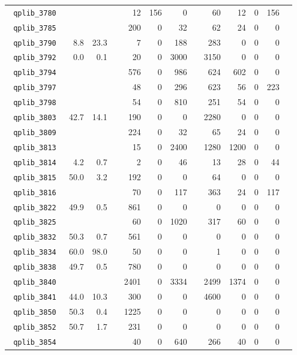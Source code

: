 {\begin{longtable}{lrrrrrrrrrrrr}
\texttt{ 	qplib\_3780	}	&		&		&	&	12	&	156	&	0	&	&	60	&	12	&	0	&	156	\\
\texttt{ 	qplib\_3785	}	&		&		&	&	200	&	0	&	32	&	&	62	&	24	&	0	&	0	\\
\texttt{ 	qplib\_3790	}	&	8.8	&	23.3	&	&	7	&	0	&	188	&	&	283	&	0	&	0	&	0	\\
\texttt{ 	qplib\_3792	}	&	0.0	&	0.1	&	&	20	&	0	&	3000	&	&	3150	&	0	&	0	&	0	\\
\texttt{ 	qplib\_3794	}	&		&		&	&	576	&	0	&	986	&	&	624	&	602	&	0	&	0	\\
\texttt{ 	qplib\_3797	}	&		&		&	&	48	&	0	&	296	&	&	623	&	56	&	0	&	223	\\
\texttt{ 	qplib\_3798	}	&		&		&	&	54	&	0	&	810	&	&	251	&	54	&	0	&	0	\\
\texttt{ 	qplib\_3803	}	&	42.7	&	14.1	&	&	190	&	0	&	0	&	&	2280	&	0	&	0	&	0	\\
\texttt{ 	qplib\_3809	}	&		&		&	&	224	&	0	&	32	&	&	65	&	24	&	0	&	0	\\
\texttt{ 	qplib\_3813	}	&		&		&	&	15	&	0	&	2400	&	&	1280	&	1200	&	0	&	0	\\
\texttt{ 	qplib\_3814	}	&	4.2	&	0.7	&	&	2	&	0	&	46	&	&	13	&	28	&	0	&	44	\\
\texttt{ 	qplib\_3815	}	&	50.0	&	3.2	&	&	192	&	0	&	0	&	&	64	&	0	&	0	&	0	\\
\texttt{ 	qplib\_3816	}	&		&		&	&	70	&	0	&	117	&	&	363	&	24	&	0	&	117	\\
\texttt{ 	qplib\_3822	}	&	49.9	&	0.5	&	&	861	&	0	&	0	&	&	0	&	0	&	0	&	0	\\
\texttt{ 	qplib\_3825	}	&		&		&	&	60	&	0	&	1020	&	&	317	&	60	&	0	&	0	\\
\texttt{ 	qplib\_3832	}	&	50.3	&	0.7	&	&	561	&	0	&	0	&	&	0	&	0	&	0	&	0	\\
\texttt{ 	qplib\_3834	}	&	60.0	&	98.0	&	&	50	&	0	&	0	&	&	1	&	0	&	0	&	0	\\
\texttt{ 	qplib\_3838	}	&	49.7	&	0.5	&	&	780	&	0	&	0	&	&	0	&	0	&	0	&	0	\\
\texttt{ 	qplib\_3840	}	&		&		&	&	2401	&	0	&	3334	&	&	2499	&	1374	&	0	&	0	\\
\texttt{ 	qplib\_3841	}	&	44.0	&	10.3	&	&	300	&	0	&	0	&	&	4600	&	0	&	0	&	0	\\
\texttt{ 	qplib\_3850	}	&	50.3	&	0.4	&	&	1225	&	0	&	0	&	&	0	&	0	&	0	&	0	\\
\texttt{ 	qplib\_3852	}	&	50.7	&	1.7	&	&	231	&	0	&	0	&	&	0	&	0	&	0	&	0	\\
\texttt{ 	qplib\_3854	}	&		&		&	&	40	&	0	&	640	&	&	266	&	40	&	0	&	0	\\

\end{longtable}}
